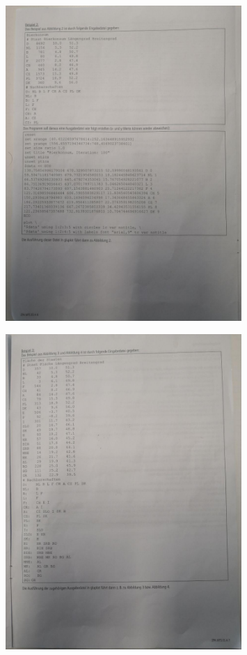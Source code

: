 \begin{figure}[htb]
    \centering
    \includegraphics[width=0.8\textwidth,]{./aufgabenstellung/6.jpg}
\end{figure}

\begin{figure}[htb]
    \centering
    \includegraphics[width=0.8\textwidth,]{./aufgabenstellung/7.jpg}
\end{figure}

